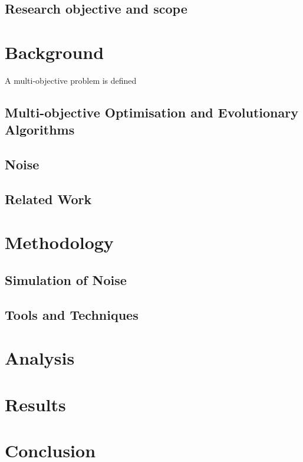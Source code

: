 \documentclass[conference,a4paper]{IEEEtran}
\begin{document}
\subsection{Research objective and scope}\label{sec: oneA}


\section{Background}\label{sec: two}
A multi-objective problem is defined 

\subsection{Multi-objective Optimisation and Evolutionary Algorithms}\label{sec:twoA}

\subsection{Noise}\label{sec:twoB}

\subsection{Related Work}\label{sec: twoC}

\section{Methodology}\label{sec: three}

\subsection{Simulation of Noise}\label{sec: threeA}

\subsection{Tools and Techniques}\label{sec: threeB}

\section{Analysis}\label{sec: four}

\section{Results}\label{sec: five}

\section{Conclusion}\label{sec: six}
\end{document}
